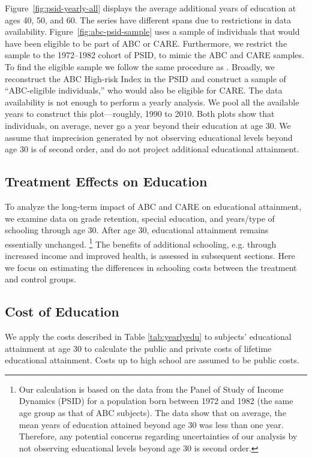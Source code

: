 \noindent Figure~\ref{fig:psid-yearly-all} displays the average additional years of education at ages 40, 50, and 60. The series have different spans due to restrictions in data availability. Figure~\ref{fig:abc-psid-sample} uses a sample of individuals that would have been eligible to be part of ABC or CARE. Furthermore, we restrict the sample to the 1972--1982 cohort of PSID, to mimic the ABC and CARE samples. To find the eligible sample we follow the same procedure as \citet{Garcia_Heckman_2014_AbilityCharacter}. Broadly, we reconstruct the ABC High-risk Index in the PSID and construct a sample of ``ABC-eligible individuals,'' who would also be eligible for CARE. The data availability is not enough to perform a yearly analysis. We pool all the available years to construct this plot---roughly, 1990 to 2010. Both plots show that individuals, on average, never go a year beyond their education at age 30. We assume that imprecision generated by not observing educational levels beyond age 30 is of second order, and do not project additional educational attainment. \\


\subsection{Treatment Effects on Education}
\noindent To analyze the long-term impact of ABC and CARE on educational attainment,
we examine data on grade retention, special education, and
years/type of schooling through age 30. After age 30,
educational attainment remains essentially
unchanged.%
	\footnote{Our calculation is based on
	the data from the Panel of Study of Income Dynamics (PSID) for a
	population born between 1972 and 1982 (the same age group as that of
	ABC subjects). The data show that on average, the mean years of education attained
	beyond age 30 was less than one year.
	Therefore, any potential concerns regarding uncertainties of our analysis
	by not observing educational levels beyond age 30 is second
	order.}
The benefits of additional schooling, e.g. through
increased income and improved health, is assessed in
subsequent sections. Here we focus on estimating the
differences in schooling costs between the treatment and
control groups. \\

\subsection{Cost of Education}
\noindent We apply the costs described in Table \ref{tab:yearlyedu} to subjects' educational attainment at age 30 to calculate the public and private costs of lifetime educational attainment. Costs up to high school are assumed to be public costs. \\

